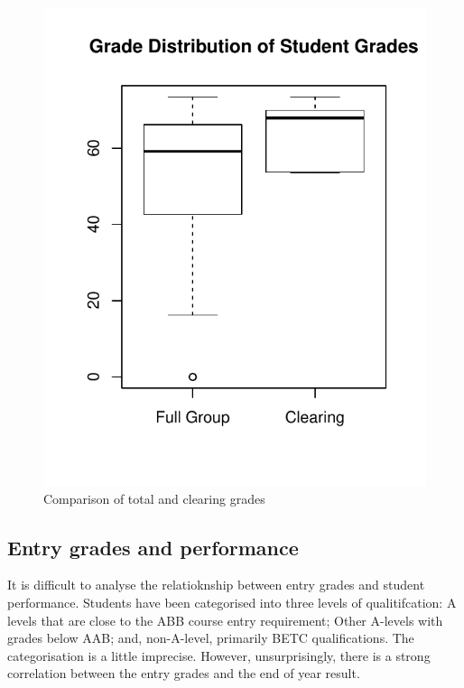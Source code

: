 \documentclass[12pt, a4paper, oneside]{article}\usepackage[]{graphicx}\usepackage[]{color}
\makeatletter
\def\maxwidth{ %
  \ifdim\Gin@nat@width>\linewidth
    \linewidth
  \else
    \Gin@nat@width
  \fi
}
\newenvironment{knitrout}{}{} %
\makeatother
\begin{document}
\begin{knitrout}
\color{fgcolor}\begin{figure}[]

\includegraphics[width=\maxwidth]{figure/boxplot1} \caption[Comparison of total and clearing grades]{Comparison of total and clearing grades\label{fig:boxplot1}}
\end{figure}


\end{knitrout}

\subsection*{Entry grades and performance}
It is difficult to analyse the relatioknship between entry grades and student performance.  Students have been categorised into three levels of qualitifcation:  A levels that are close to the ABB course entry requirement; Other A-levels with grades below AAB; and, non-A-level, primarily BETC qualifications.  The categorisation is a little imprecise.  However, unsurprisingly, there is a strong correlation between the entry grades and the end of year result.
\end{document}
